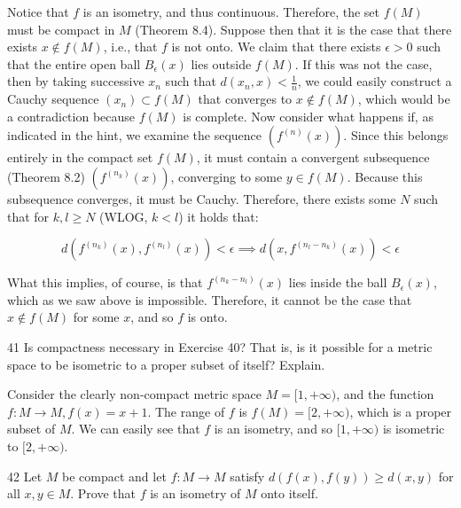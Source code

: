 \begin{solution}
    
    Notice that $f$ is an isometry, and thus continuous.
    Therefore, the set $f(M)$ must be compact in $M$ (Theorem 8.4).
    Suppose then that it is the case that there exists $x \notin f(M)$, i.e., that $f$ is not onto.
    We claim that there exists $\epsilon > 0$ such that the entire open ball $B_{\epsilon}(x)$ lies outside $f(M)$.
    If this was not the case, then by taking successive $x_n$ such that $d(x_n, x) < \frac{1}{n}$, we could easily construct a Cauchy sequence $(x_n) \subset f(M)$ that converges to $x \notin f(M)$, which would be a contradiction because $f(M)$ is complete.
    Now consider what happens if, as indicated in the hint, we examine the sequence $(f^{(n)}(x))$.
    Since this belongs entirely in the compact set $f(M)$, it must contain a convergent subsequence (Theorem 8.2) $(f^{(n_k)}(x))$, converging to some $y \in f(M)$.
    Because this subsequence converges, it must be Cauchy.
    Therefore, there exists some $N$ such that for $k, l \geq N$ (WLOG, $k < l$) it holds that:

    \[d(f^{(n_k)}(x), f^{(n_l)}(x)) < \epsilon \implies d(x, f^{(n_l - n_k)}(x)) < \epsilon\]

    What this implies, of course, is that $f^{(n_k - n_l)}(x)$ lies inside the ball $B_{\epsilon}(x)$, which as we saw above is impossible.
    Therefore, it cannot be the case that $x \notin f(M)$ for some $x$, and so $f$ is onto.
\end{solution}

\begin{exercise}{41}
    Is compactness necessary in Exercise 40?
    That is, is it possible for a metric space to be isometric to a proper subset of itself?
    Explain.
\end{exercise}

\begin{solution}
    
    Consider the clearly non-compact metric space $M = [1, +\infty)$, and the function $f: M \rightarrow M, f(x) = x + 1$.
    The range of $f$ is $f(M) = [2, +\infty)$, which is a proper subset of $M$.
    We can easily see that $f$ is an isometry, and so $[1, +\infty)$ is isometric to $[2, +\infty)$.
\end{solution}

\begin{exercise}{42}
    Let $M$ be compact and let $f: M \rightarrow M$ satisfy $d(f(x), f(y)) \geq d(x, y)$ for all $x, y \in M$.
    Prove that $f$ is an isometry of $M$ onto itself.
\end{exercise}

